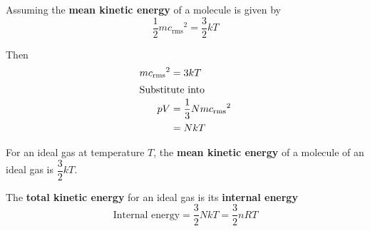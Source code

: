 Assuming the \textbf{mean kinetic energy} of a molecule is given by
$$\frac{1}{2}m{c_\text{rms}}^2=\frac{3}{2}kT$$

Then
\begin{align*}
    m{c_\text{rms}}^2&=3kT\\
    \intertext{Substitute into}
                  pV&=\frac{1}{3}Nm{c_\text{rms}}^2\\
                    &=NkT
\end{align*}

For an ideal gas at temperature $T$, the \textbf{mean kinetic energy} of a molecule of an ideal gas is $\dfrac{3}{2}kT$.

The \textbf{total kinetic energy} for an ideal gas is its \textbf{internal energy}
$$\text{Internal energy}=\frac{3}{2}NkT=\frac{3}{2}nRT$$
